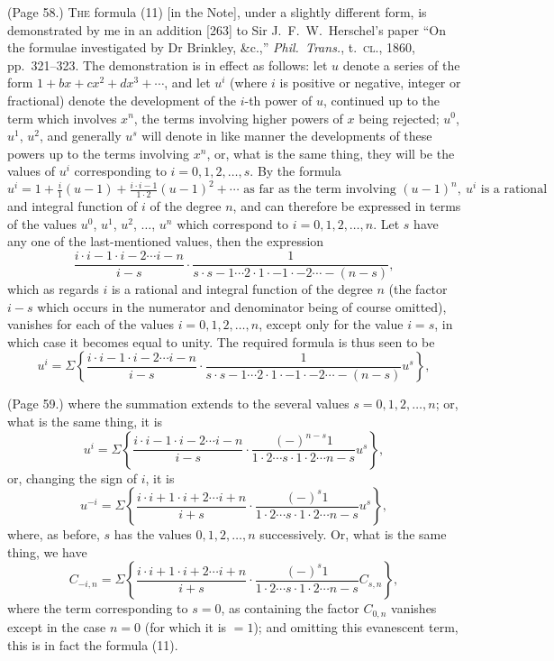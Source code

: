 \documentclass[11pt,a4paper]{article}
\begin{document}
\noindent (Page 58.) \textsc{The} formula (11) [in the Note], under a slightly different form, is demonstrated by me in an addition [263] to Sir J.~F.~W.\ Herschel's paper ``On the formulae investigated by Dr Brinkley, \&c.,'' \textit{Phil.\ Trans.}, t.\ \textsc{cl.}, 1860, pp.~321--323. The demonstration is in effect as follows: let $u$ denote a series of the form $1 + bx + cx^2 + dx^3 + \cdots$, and let $u^i$ (where $i$ is positive or negative, integer or fractional) denote the development of the $i$-th power of $u$, continued up to the term which involves $x^n$, the terms involving higher powers of $x$ being rejected; $u^0$, $u^1$, $u^2$, and generally $u^s$ will denote in like manner the developments of these powers up to the terms involving $x^n$, or, what is the same thing, they will be the values of $u^i$ corresponding to $i = 0, 1, 2, \ldots, s$. By the formula
\[
u^i = 1 + \tfrac{i}{1}(u - 1) + \tfrac{i \cdot i - 1}{1 \cdot 2}(u - 1)^2 + \cdots \text{ as far as the term involving } (u - 1)^n,\ u^i \text{ is a rational}
\]
and integral function of $i$ of the degree $n$, and can therefore be expressed in terms of the values $u^0$, $u^1$, $u^2$, $\ldots$, $u^n$ which correspond to $i = 0, 1, 2, \ldots, n$. Let $s$ have any one of the last-mentioned values, then the expression
\[
\frac{i \cdot i - 1 \cdot i - 2 \cdots i - n}{i - s} \cdot \frac{1}{s \cdot s - 1 \cdots 2 \cdot 1 \cdot -1 \cdot -2 \cdots -(n - s)},
\]
which as regards $i$ is a rational and integral function of the degree $n$ (the factor $i - s$ which occurs in the numerator and denominator being of course omitted), vanishes for each of the values $i = 0, 1, 2, \ldots, n$, except only for the value $i = s$, in which case it becomes equal to unity. The required formula is thus seen to be
\[
u^i = \Sigma \left\{ \frac{i \cdot i - 1 \cdot i - 2 \cdots i - n}{i - s} \cdot \frac{1}{s \cdot s - 1 \cdots 2 \cdot 1 \cdot -1 \cdot -2 \cdots -(n - s)} u^s \right\},
\]

\bigskip

\noindent (Page 59.) where the summation extends to the several values $s = 0, 1, 2, \ldots, n$; or, what is the same thing, it is
\[
u^i = \Sigma \left\{ \frac{i \cdot i - 1 \cdot i - 2 \cdots i - n}{i - s} \cdot \frac{(-)^{n-s} 1}{1 \cdot 2 \cdots s \cdot 1 \cdot 2 \cdots n - s} u^s \right\},
\]
or, changing the sign of $i$, it is
\[
u^{-i} = \Sigma \left\{ \frac{i \cdot i + 1 \cdot i + 2 \cdots i + n}{i + s} \cdot \frac{(-)^s 1}{1 \cdot 2 \cdots s \cdot 1 \cdot 2 \cdots n - s} u^s \right\},
\]
where, as before, $s$ has the values $0, 1, 2, \ldots, n$ successively. Or, what is the same thing, we have
\[
C_{-i, n} = \Sigma \left\{ \frac{i \cdot i + 1 \cdot i + 2 \cdots i + n}{i + s} \cdot \frac{(-)^s 1}{1 \cdot 2 \cdots s \cdot 1 \cdot 2 \cdots n - s} C_{s, n} \right\},
\]
where the term corresponding to $s = 0$, as containing the factor $C_{0, n}$ vanishes except in the case $n = 0$ (for which it is $= 1$); and omitting this evanescent term, this is in fact the formula (11).
\end{document}
